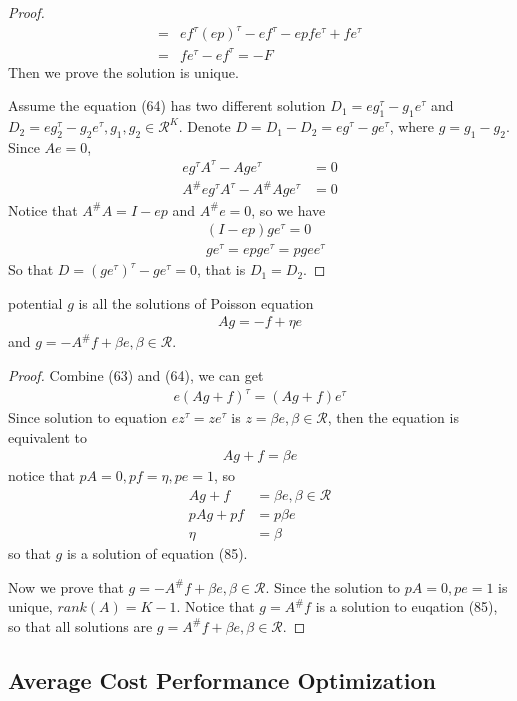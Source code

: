 \documentclass[runningheads]{llncs}
\begin{document}
\begin{proof}
\begin{align}
            = &ef^\tau(ep)^\tau - ef^\tau - epfe^\tau + fe^\tau \\
            = &fe^\tau - ef^\tau = -F
        \end{align}
        Then we prove the solution is unique.
        \par
        Assume the equation (64) has two different solution
        $D_1 = eg_1^\tau - g_1e^\tau$ and $D_2 = eg_2^\tau - g_2e^\tau, g_1, g_2 \in \mathcal{R}^K$.
        Denote $D = D_1 - D_2 = eg^\tau - ge^\tau$, where $g = g_1 - g_2$.
        Since $Ae = 0$, 
        \begin{align}
            eg^\tau A^\tau - Age^\tau &= 0 \\
            A^\# eg^\tau A^\tau - A^\# Age^\tau &= 0
        \end{align}
        Notice that $A^\# A = I - ep$ and $A^\# e = 0$,
        so we have
        \begin{align}
            &(I - ep) ge^\tau = 0 \\
            &ge^\tau = epge^\tau = pg ee^\tau
        \end{align}
        So that $D = (ge^\tau)^\tau - ge^\tau = 0$, that is $D_1 = D_2$.
    \end{proof}
    \begin{lemma}
        potential $g$ is all the solutions of Poisson equation
        \begin{align}
            Ag = -f + \eta e
        \end{align}
        and $g = -A^\# f + \beta e, \beta \in \mathcal{R}$.
    \end{lemma}
    \begin{proof}
        Combine (63) and (64), we can get
        \begin{align}
            e(Ag + f)^\tau = (Ag + f)e^\tau
        \end{align}
        Since solution to equation $ez^\tau = ze^\tau$ is $z = \beta e, \beta \in \mathcal{R}$,
        then the equation is equivalent to 
        \begin{align}
            Ag + f = \beta e
        \end{align}
        notice that $pA = 0, pf = \eta, pe = 1$, so
        \begin{align}
            Ag + f &= \beta e, \beta \in \mathcal{R} \\
            pAg + pf &= p\beta e \\
            \eta &= \beta
        \end{align}
        so that $g$ is a solution of equation (85).
        \par
        Now we prove that $g = -A^\# f + \beta e, \beta \in \mathcal{R}$.
        Since the solution to $pA = 0, pe = 1$ is unique,
        $rank(A) = K - 1$. Notice that $g = A^\# f$ is a solution
        to euqation (85), so that all solutions are
        $g = A^\# f + \beta e, \beta \in \mathcal{R}$.
    \end{proof}
    \subsection{Average Cost Performance Optimization}

    
\end{document}
